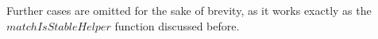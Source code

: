 {\begin{code}
\AgdaDottedPattern{\AgdaSymbol{)}}\AgdaSpace{}%
\AgdaSpace{}%
\AgdaDottedPattern{\AgdaSymbol{(}}\AgdaSpace{}%
\AgdaDottedPattern{\AgdaOperator{\AgdaInductiveConstructor{,}}}\AgdaSpace{}%
\AgdaDottedPattern{\AgdaSymbol{)}}\AgdaSpace{}%
\AgdaSpace{}%
\AgdaDottedPattern{\AgdaInductiveConstructor{[]}}\AgdaDottedPattern{\AgdaSymbol{)}}\AgdaSymbol{)}\<%
\\
\>[.][@{}l@{}]\<[3644I]%
\>[31]\AgdaSymbol{(}\AgdaSpace{}%
\AgdaSymbol{(}\AgdaSpace{}%
\AgdaSymbol{(}\AgdaSpace{}%
\AgdaSymbol{())))}\<%
\\
%
\>[31]\<%
\end{code}

Further cases are omitted for the sake of brevity, as it works exactly as the $matchIsStableHelper$ function discussed before.

}
